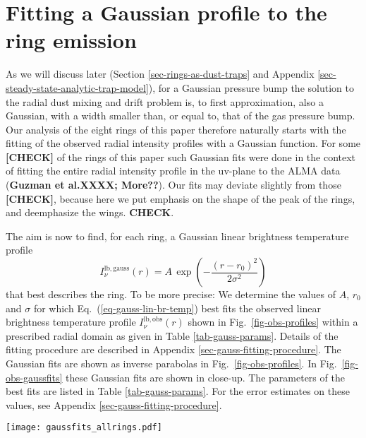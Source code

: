 \documentclass{aa}
\begin{document}
\section{Fitting a Gaussian profile to the ring emission}
\label{sec-gauss-fits}
%
As we will discuss later (Section \ref{sec-rings-as-dust-traps} and Appendix
\ref{sec-steady-state-analytic-trap-model}), for a
Gaussian pressure bump the solution to the radial dust mixing and drift problem
is, to first approximation, also a Gaussian, with a width smaller than, or equal
to, that of the gas pressure bump. Our analysis of the eight rings of this paper
therefore naturally starts with the fitting of the observed radial intensity
profiles with a Gaussian function. For some {\bf [CHECK]} of the rings of this
paper such Gaussian fits were done in the context of fitting the entire radial
intensity profile in the uv-plane to the ALMA data ({\bf Guzman et al.XXXX;
  More??}). Our fits may deviate slightly from those {\bf [CHECK]}, because here
we put emphasis on the shape of the peak of the rings, and deemphasize the
wings. {\bf CHECK}.

The aim is now to find, for each ring, a Gaussian linear brightness temperature
profile
\begin{equation}\label{eq-gauss-lin-br-temp}
I_{\nu}^{\mathrm{lb,gauss}}(r) = A\,\exp\left(-\frac{(r-r_0)^2}{2\sigma^2}\right)
\end{equation}
that best describes the ring. To be more precise: We determine the values of
$A$, $r_0$ and $\sigma$ for which Eq.~(\ref{eq-gauss-lin-br-temp}) best fits the
observed linear brightness temperature profile $I_{\nu}^{\mathrm{lb,obs}}(r)$
shown in Fig.~\ref{fig-obs-profiles} within a prescribed radial domain as given
in Table \ref{tab-gauss-params}. Details of the fitting procedure are described
in Appendix \ref{sec-gauss-fitting-procedure}. The Gaussian fits are shown as
inverse parabolas in Fig.\ \ref{fig-obs-profiles}. In
Fig.~\ref{fig-obs-gaussfits} these Gaussian fits are shown in close-up. The
parameters of the best fits are listed in Table \ref{tab-gauss-params}.  For the
error estimates on these values, see Appendix \ref{sec-gauss-fitting-procedure}.

\begin{figure*}
\centerline{\texttt{[image: gaussfits\_allrings.pdf]}}
\caption{\label{fig-obs-gaussfits}Gaussian fits to the eight rings of this
  paper. The blue curves are the observations, the orange curves are the best fit
  Gaussian profiles. The ``fit range'' bar shows the radial range within which
  the Gauss was fitted to the data. The fit range was chosen to fit the part of
  the curve that, by eye, most resembles a Gaussian. The ``beam'' bar shows the
  FWHM beam size of the observations. The grey band around the blue curve shows
  the estimated uncertainty of the data. {\bf TODO: y-labels}}
\end{figure*}
\end{document}
